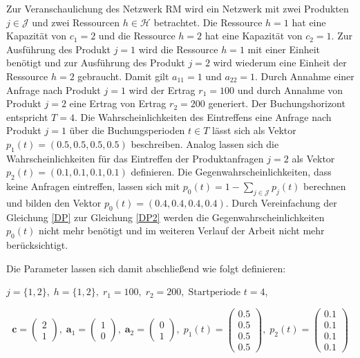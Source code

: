 Zur Veranschaulichung des Netzwerk RM wird ein Netzwerk mit zwei Produkten $j\in\mathcal{J}$ und zwei Ressourcen $h\in\mathcal{H}$ betrachtet. Die Ressource $h=1$ hat eine Kapazität von $c_{1}=2$ und die Ressource $h=2$ hat eine Kapazität von $c_{2}=1$. Zur Ausführung des Produkt $j=1$ wird die Ressource $h=1$ mit einer Einheit benötigt und zur Ausführung des Produkt $j=2$ wird wiederum eine Einheit der Ressource $h=2$ gebraucht. Damit gilt $a_{11}=1$ und $a_{22}=1$. Durch Annahme einer Anfrage nach Produkt $j=1$ wird der Ertrag $r_{1}=100$ und durch Annahme von Produkt $j=2$ eine Ertrag von Ertrag $r_{2}=200$ generiert. Der Buchungshorizont entspricht $T=4$. Die Wahrscheinlichkeiten des Eintreffens eine Anfrage nach Produkt $j=1$ über die Buchungsperioden $t\in T$ lässt sich als Vektor $p_{1}(t)=(0.5, 0.5, 0.5, 0.5)$ beschreiben. Analog lassen sich die Wahrscheinlichkeiten für das Eintreffen der Produktanfragen $j=2$ als Vektor $p_{2}(t)=(0.1, 0.1, 0.1, 0.1)$ definieren. Die Gegenwahrscheinlichkeiten, dass keine Anfragen eintreffen, lassen sich mit $p_{0}(t)=1-\sum_{j\in \mathcal{J}}p_{j}(t)$ berechnen und bilden den Vektor $p_{0}(t)=(0.4, 0.4, 0.4, 0.4)$. Durch Vereinfachung der Gleichung \eqref{DP} zur Gleichung \eqref{DP2} werden die Gegenwahrscheinlichkeiten $p_{0}(t)$ nicht mehr benötigt und im weiteren Verlauf der Arbeit nicht mehr berücksichtigt.

Die Parameter lassen sich damit abschließend wie folgt definieren:
\begin{center}
$j = \{1, 2\}, \; h = \{1, 2\}, \; r_{1} = 100, \; r_{2} = 200, \; \text{Startperiode } t=4$,
\end{center}
\[
    \textbf{c}=\begin{pmatrix} 2 \\ 1 \end{pmatrix}, \;
    \textbf{a}_1=\begin{pmatrix} 1 \\ 0 \end{pmatrix}, \;
     \textbf{a}_2=\begin{pmatrix} 0 \\ 1 \end{pmatrix}, \;
     p_{1}(t)=\begin{pmatrix} 0.5\\ 0.5\\ 0.5\\ 0.5  \end{pmatrix}, \;
     p_{2}(t)=\begin{pmatrix} 0.1\\ 0.1\\ 0.1\\ 0.1  \end{pmatrix}
  \]

